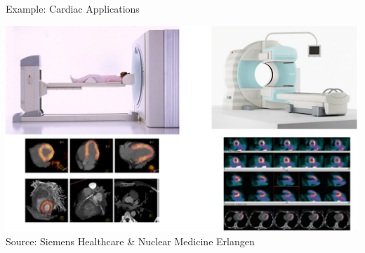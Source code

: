 \begin{frame}{Example: Cardiac Applications}
    \begin{center}\includegraphics[height=0.8\textheight]{images/cardiac}\\
        {\scriptsize Source: Siemens Healthcare \& Nuclear Medicine Erlangen}\\
    \end{center}
\end{frame}

